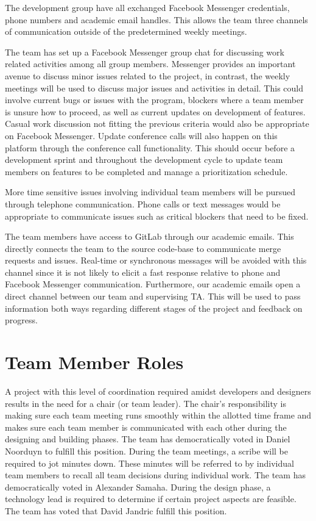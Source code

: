\documentclass{article}
\begin{document}
The development group have all exchanged Facebook Messenger credentials, phone
numbers and academic email handles. This allows the team three channels of
communication outside of the predetermined weekly meetings.

The team has set up a Facebook Messenger group chat for discussing work related
activities among all group members. Messenger provides an important avenue to
discuss minor issues related to the project, in contrast, the weekly meetings
will be used to discuss major issues and activities in detail. This could
involve current bugs or issues with the program, blockers where a team member is
unsure how to proceed, as well as current updates on development of features.
Casual work discussion not fitting the previous criteria would also be
appropriate on Facebook Messenger. Update conference calls will also happen on
this platform through the conference call functionality. This should occur
before a development sprint and throughout the development cycle to update team
members on features to be completed and manage a prioritization schedule.

More time sensitive issues involving individual team members will be pursued
through telephone communication. Phone calls or text messages would be
appropriate to communicate issues such as critical blockers that need to be
fixed.

The team members have access to GitLab through our academic emails. This
directly connects the team to the source code-base to communicate merge requests
and issues. Real-time or synchronous messages will be avoided with this channel
since it is not likely to elicit a fast response relative to phone and Facebook
Messenger communication. Furthermore, our academic emails open a direct channel
between our team and supervising TA. This will be used to pass information both
ways regarding different stages of the project and feedback on progress.

\section{Team Member Roles}

A project with this level of coordination required amidst developers and
designers results in the need for a chair (or team leader). The chair's
responsibility is making sure each team meeting runs smoothly within the
allotted time frame and makes sure each team member is communicated with each
other during the designing and building phases. The team has democratically
voted in Daniel Noorduyn to fulfill this position.  During the team meetings, a
scribe will be required to jot minutes down. These minutes will be referred to
by individual team members to recall all team decisions during individual work.
The team has democratically voted in Alexander Samaha. During the design phase,
a technology lead is required to determine if certain project aspects are
feasible. The team has voted that David Jandric fulfill this position.
\end{document}
